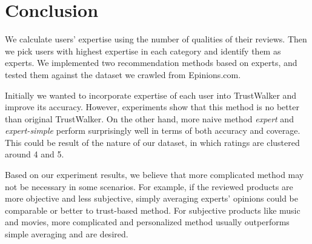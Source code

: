 \documentclass[12pt]{article}
\begin{document}
\section{Conclusion}
We calculate users' expertise using the number of qualities of their reviews. Then we pick users with highest expertise in each category and identify them as experts. We implemented two recommendation methods based on experts, and tested them against the dataset we crawled from Epinions.com. 

Initially we wanted to incorporate expertise of each user into TrustWalker and improve its accuracy. However, experiments show that this method is no better than original TrustWalker. On the other hand, more naive method \emph{expert} and \emph{expert-simple} perform surprisingly well in terms of both accuracy and coverage. This could be result of the nature of our dataset, in which ratings are clustered around 4 and 5. 

Based on our experiment results, we believe that more complicated method may not be necessary in some scenarios. For example, if the reviewed products are more objective and less subjective, simply averaging experts' opinions could be comparable or better to trust-based method. For subjective products like music and movies, more complicated and personalized method usually outperforms simple averaging and are desired. 



\end{document}
